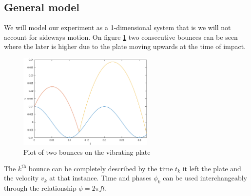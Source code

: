 \documentclass[12pt,oneside,a4paper]{article}
\numberwithin{equation}{section}
\begin{document}
{{{{\subsection{General model}
We will model our experiment as a 1-dimensional system that is we will not account for sideways motion. On figure \ref{bounces} two consecutive bounces can be seen where the later is higher due to the plate  moving upwards at the time of impact.
\begin{figure}[h]
	\centering
	\includegraphics[width=0.6\textwidth]{Figures/bounceplot.eps}
	\caption{Plot of two bounces on the vibrating plate}
	\label{bounces}
\end{figure}
The $k^{\text{th}}$ bounce can be completely described by the time $t_k$ it left the plate and the velocity $v_k$ at that instance. Time and phases $\phi_k$ can be used interchangeably through the relationship $\phi=2\pi f t$.

}}}}
\end{document}

